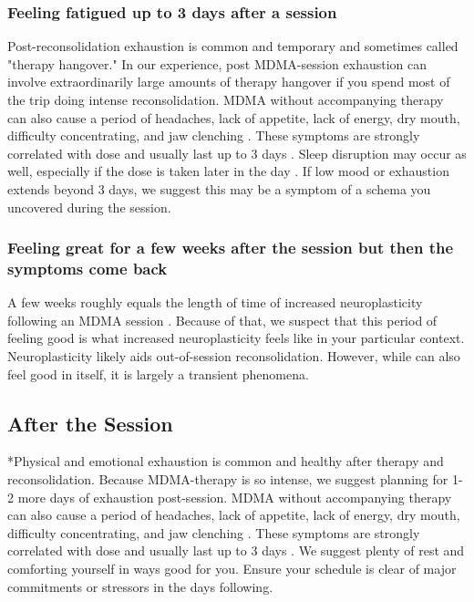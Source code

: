 \documentclass[12pt,letterpaper]{book}
\begin{document}
\subsubsection{Feeling fatigued up to 3 days after a session}
Post-reconsolidation exhaustion is common and temporary and sometimes called "therapy hangover." In our experience, post MDMA-session exhaustion can involve extraordinarily large amounts of therapy hangover if you spend most of the trip doing intense reconsolidation. MDMA without accompanying therapy can also cause a period of headaches, lack of appetite, lack of energy, dry mouth, difficulty concentrating, and jaw clenching \cite{vizeliActuteEffects}. These symptoms are strongly correlated with dose and usually last up to 3 days \cite{liechtiGender}. Sleep disruption may occur as well, especially if the dose is taken later in the day \cite{berro2018acute}. If low mood or exhaustion extends beyond 3 days, we suggest this may be a symptom of a schema you uncovered during the session.
\subsubsection{Feeling great for a few weeks after the session but then the symptoms come back}
A few weeks roughly equals the length of time of increased neuroplasticity following an MDMA session \cite{nardouMDMAPlasticity}. Because of that, we suspect that this period of feeling good is what increased neuroplasticity feels like in your particular context. Neuroplasticity likely aids out-of-session reconsolidation. However, while can also feel good in itself, it is largely a transient phenomena.
\subsection{After the Session}
\label{after}
*Physical and emotional exhaustion is common and healthy after therapy and reconsolidation. Because MDMA-therapy is so intense, we suggest planning for 1-2 more days of exhaustion post-session. MDMA without accompanying therapy can also cause a period of headaches, lack of appetite, lack of energy, dry mouth, difficulty concentrating, and jaw clenching \cite{vizeliActuteEffects}. These symptoms are strongly correlated with dose and usually last up to 3 days \cite{liechtiGender}. We suggest plenty of rest and comforting yourself in ways good for you. Ensure your schedule is clear of major commitments or stressors in the days following. 
\end{document}
